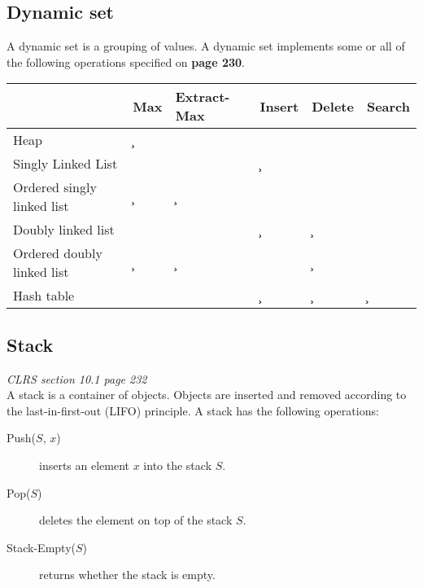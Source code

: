 \subsection{Dynamic set}
A dynamic set is a grouping of values.
A dynamic set implements some or all of the following operations specified on \textbf{page 230}.\\
\begin{tabularx}{\linewidth}{Xlp{1.2cm}lll}
	\toprule
	                           & \textbf{Max} & \textbf{Extract-Max} & \textbf{Insert} & \textbf{Delete} & \textbf{Search} \\ \midrule
	Heap                       & \c               & \lgn                 & \lgn            & \lgn            & \n              \\
	Singly Linked List         & \n               & \n                   & \c              & \n              & \n              \\
	Ordered singly linked list & \c               & \c                   & \n              & \n              & \n              \\
	Doubly linked list         & \n               & \n                   & \c              & \c              & \n              \\
	Ordered doubly linked list & \c               & \c                   & \n              & \c              & \n              \\
	Hash table                 & \n               & \n                   & \c              & \c              & \c              \\ \bottomrule
\end{tabularx}
\subsection{Stack}
\textit{CLRS section 10.1 page 232}\\
A stack is a container of objects. Objects are inserted and removed according to the last-in-first-out (LIFO) principle.
A stack has the following operations:
\begin{description}
	\item[Push($ S $, $ x $)] inserts an element $ x $ into the stack $ S $.
	\item[Pop($ S $)] deletes the element on top of the stack $ S $. 
	\item[Stack-Empty($ S $)] returns whether the stack is empty.
\end{description}

